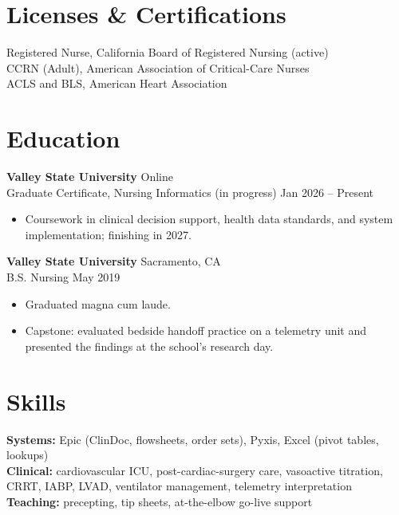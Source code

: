 \documentclass[11pt, letterpaper]{article}
\begin{document}
\section{Licenses \& Certifications}

Registered Nurse, California Board of Registered Nursing (active) \\
CCRN (Adult), American Association of Critical-Care Nurses \\
ACLS and BLS, American Heart Association

\section{Education}

\textbf{Valley State University} \hfill Online \\
Graduate Certificate, Nursing Informatics (in progress) \hfill Jan 2026 – Present
\begin{itemize}
  \item Coursework in clinical decision support, health data standards, and system implementation; finishing in 2027.
\end{itemize}
\vspace{0pt}
\textbf{Valley State University} \hfill Sacramento, CA \\
B.S. Nursing \hfill May 2019
\begin{itemize}
  \item Graduated magna cum laude.
  \item Capstone: evaluated bedside handoff practice on a telemetry unit and presented the findings at the school's research day.
\end{itemize}
\vspace{0pt}
\section{Skills}

\textbf{Systems:} Epic (ClinDoc, flowsheets, order sets), Pyxis, Excel (pivot tables, lookups) \\
\textbf{Clinical:} cardiovascular ICU, post-cardiac-surgery care, vasoactive titration, CRRT, IABP, LVAD, ventilator management, telemetry interpretation \\
\textbf{Teaching:} precepting, tip sheets, at-the-elbow go-live support


\par{}
\end{document}

